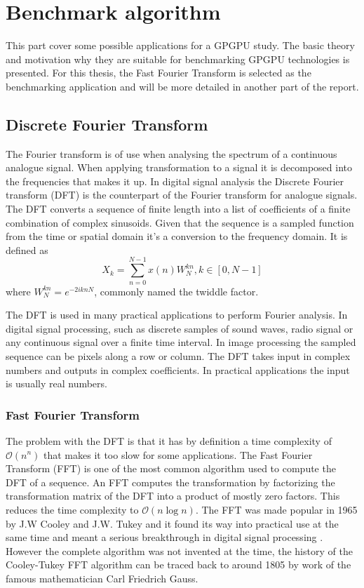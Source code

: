 \chapter{Benchmark algorithm}
This part cover some possible applications for a GPGPU study. The basic theory and motivation why they are suitable for benchmarking GPGPU technologies is presented. For this thesis, the Fast Fourier Transform is selected as the benchmarking application and will be more detailed in another part of the report.

\newtheorem{thm}{Theorem}[chapter] %
\theoremstyle{definition}
\newtheorem{defn}[thm]{Definition} 

\section{Discrete Fourier Transform}
The Fourier transform is of use when analysing the spectrum of a continuous analogue signal. When applying transformation to a signal it is decomposed into the frequencies that makes it up. In digital signal analysis the Discrete Fourier transform (DFT) is the counterpart of the Fourier transform for analogue signals. The DFT converts a sequence of finite length into a list of coefficients of a finite combination of complex sinusoids. Given that the sequence is a sampled function from the time or spatial domain it's a conversion to the frequency domain. It is defined as
\begin{equation}
	X_k=\sum_{n=0}^{N-1}x(n)W_N^{kn}, k \in {[0, N-1]}	
\end{equation}
where $W_N^{kn}=e^{-2iknN}$, commonly named the twiddle factor\cite{Gentleman1966}.

The DFT is used in many practical applications to perform Fourier analysis. In digital signal processing, such as discrete samples of sound waves, radio signal or any continuous signal over a finite time interval. In image processing the sampled sequence can be pixels along a row or column. The DFT takes input in complex numbers and outputs in complex coefficients. In practical applications the input is usually real numbers.

\subsection{Fast Fourier Transform}
The problem with the DFT is that it has by definition a time complexity of $\mathcal{O}(n^n)$ that makes it too slow for some applications. The Fast Fourier Transform (FFT) is one of the most common algorithm used to compute the DFT of a sequence. An FFT computes the transformation by factorizing the transformation matrix of the DFT into a product of mostly zero factors. This reduces the time complexity to $\mathcal{O}(n\log{}n)$.
The FFT was made popular in 1965 by J.W Cooley and J.W. Tukey and it found its way into practical use at the same time and meant a serious breakthrough in digital signal processing \cite{Cooley1969, Brigham1967}. However the complete algorithm was not invented at the time, the history of the Cooley-Tukey FFT algorithm can be traced back to around 1805 by work of the famous mathematician Carl Friedrich Gauss\cite{Heideman1985}.


